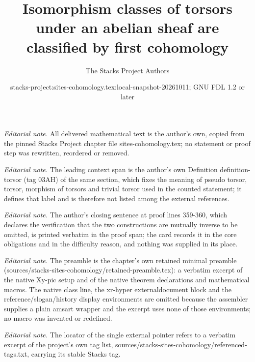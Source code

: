 \documentclass[10pt,a4paper]{amsart}
\title{Isomorphism classes of torsors under an abelian sheaf are classified by first cohomology}
\author{The Stacks Project Authors}
\date{stacks-project:sites-cohomology.tex:local-snapshot-20261011; GNU FDL 1.2 or later}
\theoremstyle{plain}
\theoremstyle{definition}
\theoremstyle{remark}
\numberwithin{equation}{subsection}
\begin{document}
\maketitle
\noindent\textit{Editorial note.} All delivered mathematical text is the author's own, copied from the pinned Stacks Project chapter file sites-cohomology.tex; no statement or proof step was rewritten, reordered or removed.\par\medskip
\noindent\textit{Editorial note.} The leading context span is the author's own Definition definition-torsor (tag 03AH) of the same section, which fixes the meaning of pseudo torsor, torsor, morphism of torsors and trivial torsor used in the counted statement; it defines that label and is therefore not listed among the external references.\par\medskip
\noindent\textit{Editorial note.} The author's closing sentence at proof lines 359-360, which declares the verification that the two constructions are mutually inverse to be omitted, is printed verbatim in the proof span; the card records it in the core obligations and in the difficulty reason, and nothing was supplied in its place.\par\medskip
\noindent\textit{Editorial note.} The preamble is the chapter's own retained minimal preamble (sources/stacks-sites-cohomology/retained-preamble.tex): a verbatim excerpt of the native Xy-pic setup and of the native theorem declarations and mathematical macros. The native class line, the xr-hyper externaldocument block and the reference/slogan/history display environments are omitted because the assembler supplies a plain amsart wrapper and the excerpt uses none of those environments; no macro was invented or redefined.\par\medskip
\noindent\textit{Editorial note.} The locator of the single external pointer refers to a verbatim excerpt of the project's own tag list, sources/stacks-sites-cohomology/referenced-tags.txt, carrying its stable Stacks tag.\par\medskip
\end{document}
